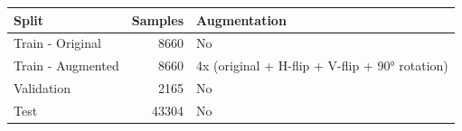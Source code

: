 \begin{tabular}{lrl}
\toprule
Split & Samples & Augmentation \\
\midrule
Train - Original & 8660 & No \\
Train - Augmented & 8660 & 4x (original + H-flip + V-flip + 90° rotation) \\
Validation & 2165 & No \\
Test & 43304 & No \\
\bottomrule
\end{tabular}
